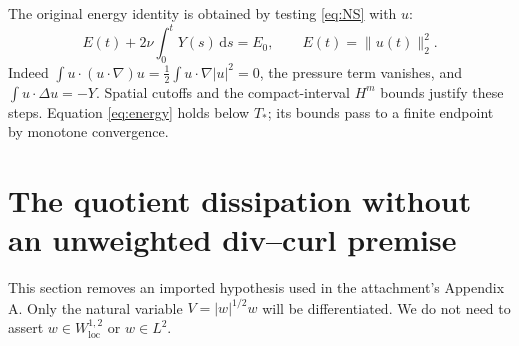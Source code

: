 \documentclass[11pt,a4paper]{article}
\theoremstyle{definition}\newtheorem{definition}[theorem]{Definition}
\theoremstyle{remark}\newtheorem{remark}[theorem]{Remark}
\newcommand{\dd}{\,\mathrm d}
\newcommand{\norm}[1]{\lVert #1\rVert}
\numberwithin{equation}{section}
\begin{document}
The original energy identity is obtained by testing \eqref{eq:NS} with $u$:
\begin{equation}\label{eq:energy}
 E(t)+2\nu\int_0^tY(s)\dd s=E_0,
 \qquad E(t)=\norm{u(t)}_2^2.
\end{equation}
Indeed $\int u\cdot(u\cdot\nabla)u=\frac12\int u\cdot\nabla|u|^2=0$, the pressure term vanishes, and $\int u\cdot\Delta u=-Y$. Spatial cutoffs and the compact-interval $H^m$ bounds justify these steps. Equation \eqref{eq:energy} holds below $T_*$; its bounds pass to a finite endpoint by monotone convergence.

\section{The quotient dissipation without an unweighted div--curl premise}
\label{sec:natural}
This section removes an imported hypothesis used in the attachment's Appendix A. Only the natural variable $V=|w|^{1/2}w$ will be differentiated. We do not need to assert $w\in W^{1,2}_{\mathrm{loc}}$ or $w\in L^2$.
\end{document}
